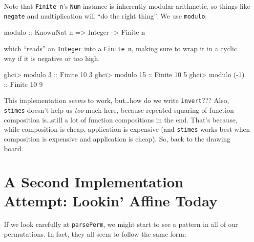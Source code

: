 \documentclass[]{article}
\newenvironment{Shaded}{}{}
\newcommand{\DataTypeTok}[1]{\textcolor[rgb]{0.56,0.13,0.00}{#1}}
\newcommand{\DecValTok}[1]{\textcolor[rgb]{0.25,0.63,0.44}{#1}}
\newcommand{\NormalTok}[1]{#1}
\newcommand{\OperatorTok}[1]{\textcolor[rgb]{0.40,0.40,0.40}{#1}}
\newcommand{\OtherTok}[1]{\textcolor[rgb]{0.00,0.44,0.13}{#1}}
\begin{document}
Note that \texttt{Finite\ n}'s \texttt{Num} instance is inherently modular
arithmetic, so things like \texttt{negate} and multiplication will ``do the
right thing''. We use \texttt{modulo}:

\begin{Shaded}
\begin{Highlighting}[]
\OtherTok{modulo ::} \DataTypeTok{KnownNat}\NormalTok{ n }\OtherTok{=>} \DataTypeTok{Integer} \OtherTok{{-}>} \DataTypeTok{Finite}\NormalTok{ n}
\end{Highlighting}
\end{Shaded}

which ``reads'' an \texttt{Integer} into a \texttt{Finite\ n}, making sure to
wrap it in a cyclic way if it is negative or too high.

\begin{Shaded}
\begin{Highlighting}[]
\NormalTok{ghci}\OperatorTok{>}\NormalTok{ modulo }\DecValTok{3}\OtherTok{ ::} \DataTypeTok{Finite} \DecValTok{10}
\DecValTok{3}
\NormalTok{ghci}\OperatorTok{>}\NormalTok{ modulo }\DecValTok{15}\OtherTok{ ::} \DataTypeTok{Finite} \DecValTok{10}
\DecValTok{5}
\NormalTok{ghci}\OperatorTok{>}\NormalTok{ modulo (}\OperatorTok{{-}}\DecValTok{1}\NormalTok{)}\OtherTok{ ::} \DataTypeTok{Finite} \DecValTok{10}
\DecValTok{9}
\end{Highlighting}
\end{Shaded}

This implementation \emph{seems} to work, but\ldots how do we write
\texttt{invert}??? Also, \texttt{stimes} doesn't help us \emph{too} much here,
because repeated squaring of function composition is\ldots still a lot of
function compositions in the end. That's because, while composition is cheap,
application is expensive (and \texttt{stimes} works best when composition is
expensive and application is cheap). So, back to the drawing board.

\hypertarget{a-second-implementation-attempt-lookin-affine-today}{%
\section{A Second Implementation Attempt: Lookin' Affine
Today}\label{a-second-implementation-attempt-lookin-affine-today}}

If we look carefully at \texttt{parsePerm}, we might start to see a pattern in
all of our permutations. In fact, they all seem to follow the same form:
\end{document}
